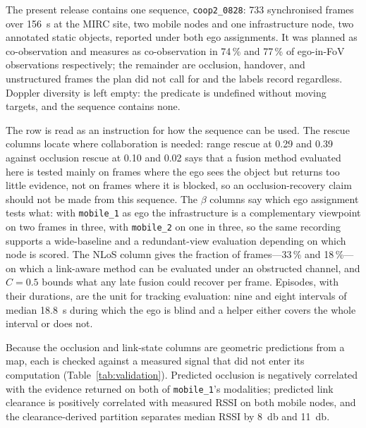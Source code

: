 The present release contains one sequence, \texttt{coop2\_0828}: \num{733}
synchronised frames over \SI{156}{\second} at the MIRC site, two mobile nodes
and one infrastructure node, two annotated static objects, reported under both
ego assignments. It was planned as co-observation and measures as
co-observation in 74\,\% and 77\,\% of ego-in-FoV observations respectively;
the remainder are occlusion, handover, and unstructured frames the plan did not
call for and the labels record regardless. Doppler diversity is left empty: the
predicate is undefined without moving targets, and the sequence contains none.

The row is read as an instruction for how the sequence can be used. The rescue
columns locate where collaboration is needed: range rescue at 0.29 and 0.39
against occlusion rescue at 0.10 and 0.02 says that a fusion method evaluated
here is tested mainly on frames where the ego sees the object but returns too
little evidence, not on frames where it is blocked, so an occlusion-recovery
claim should not be made from this sequence. The $\beta$ columns say which ego
assignment tests what: with \texttt{mobile\_1} as ego the infrastructure is a
complementary viewpoint on two frames in three, with \texttt{mobile\_2} on one
in three, so the same recording supports a wide-baseline and a redundant-view
evaluation depending on which node is scored. The NLoS column gives the
fraction of frames---33\,\% and 18\,\%---on which a link-aware method can be
evaluated under an obstructed channel, and $C = 0.5$ bounds what any late
fusion could recover per frame. Episodes, with their durations, are the unit
for tracking evaluation: nine and eight intervals of median \SI{18.8}{\second}
during which the ego is blind and a helper either covers the whole interval or
does not.

Because the occlusion and link-state columns are geometric predictions from a
map, each is checked against a measured signal that did not enter its
computation (Table~\ref{tab:validation}). Predicted occlusion is negatively
correlated with the evidence returned on both of \texttt{mobile\_1}'s
modalities; predicted link clearance is positively correlated with measured
RSSI on both mobile nodes, and the clearance-derived partition separates median
RSSI by \SI{8}{\decibel} and \SI{11}{\decibel}.

